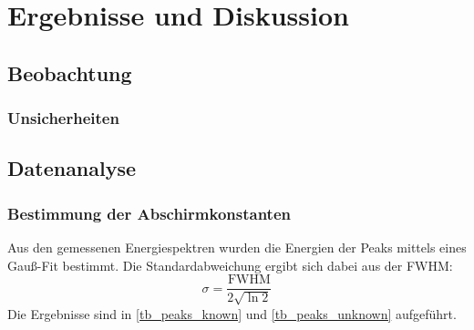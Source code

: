 \documentclass[
	a4paper,
	12pt,
	pagesize,
	ngerman
]{scrartcl}
\begin{document}
	\section{Ergebnisse und Diskussion}
	

	\subsection{Beobachtung}
	\subsubsection{Unsicherheiten} %
	\subsection{Datenanalyse}
	\subsubsection{Bestimmung der Abschirmkonstanten}
	Aus den gemessenen Energiespektren wurden die Energien der Peaks mittels eines Gauß-Fit bestimmt.
	Die Standardabweichung ergibt sich dabei aus der FWHM:
	\begin{equation}
		\sigma = \frac{\text{FWHM}}{2\sqrt{\ln 2}}
	\end{equation}
	Die Ergebnisse sind in \cref{tb_peaks_known} und \cref{tb_peaks_unknown} aufgeführt.
	
	
\end{document}
